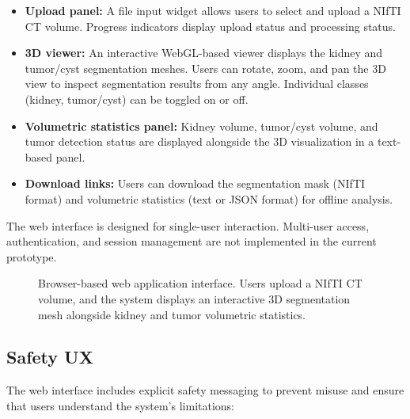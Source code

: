 \begin{itemize}
    \item \textbf{Upload panel:} A file input widget allows users to select and upload a NIfTI CT volume. Progress indicators display upload status and processing status. %
    \item \textbf{3D viewer:} An interactive WebGL-based viewer displays the kidney and tumor/cyst segmentation meshes. Users can rotate, zoom, and pan the 3D view to inspect segmentation results from any angle. Individual classes (kidney, tumor/cyst) can be toggled on or off.
    \item \textbf{Volumetric statistics panel:} Kidney volume, tumor/cyst volume, and tumor detection status are displayed alongside the 3D visualization in a text-based panel.
    \item \textbf{Download links:} Users can download the segmentation mask (NIfTI format) and volumetric statistics (text or JSON format) for offline analysis.
\end{itemize}

The web interface is designed for single-user interaction. Multi-user access, authentication, and session management are not implemented in the current prototype.

\begin{figure}[!t]
\centering
\caption{Browser-based web application interface. Users upload a NIfTI CT volume, and the system displays an interactive 3D segmentation mesh alongside kidney and tumor volumetric statistics.}
\label{fig:webapp}
\end{figure}

\subsection{Safety UX}

The web interface includes explicit safety messaging to prevent misuse and ensure that users understand the system's limitations:

